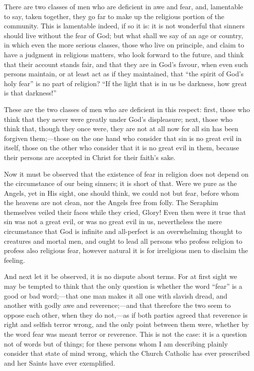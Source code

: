 There are two classes of men who are deficient in awe and fear,
and, lamentable to say, taken together, they go far to make up the
religious portion of the community. This is lamentable indeed, if so
it is: it is not wonderful that sinners should live without the fear
of God; but what shall we say of an age or country, in which even the
more serious classes, those who live on principle, and claim to have a
judgment in religious matters, who look forward to the future, and
think that their account stands fair, and that they are in God's
favour, when even such persons maintain, or at least act as if they
maintained, that ``the spirit of God's holy fear'' is no part
of religion? ``If the light that is in us be darkness, how great
is that darkness!''

These are the two classes of men who are deficient in this respect:
first, those who think that they never were greatly under God's
displeasure; next, those who think that, though they once were, they
are not at all now for all sin has been forgiven them;—those on the
one hand who consider that sin is no great evil in itself, those on
the other who consider that it is no great evil in them, because their
persons are accepted in Christ for their faith's sake.

Now it must be observed that the existence of fear in religion does
not depend on the circumstance of our being sinners; it is short of
that. Were we pure as the Angels, yet in His sight, one should think,
we could not but fear, before whom the heavens are not clean, nor the
Angels free from folly. The Seraphim themselves veiled their faces
while they cried, Glory! Even then were it true that sin was not a
great evil, or was no great evil in us, nevertheless the mere
circumstance that God is infinite and all-perfect is an overwhelming
thought to creatures and mortal men, and ought to lead all persons who
profess religion to profess also religious fear, however natural it is
for irreligious men to disclaim the feeling.

And next let it be observed, it is no dispute about terms. For at
first sight we may be tempted to think that the only question is
whether the word ``fear'' is a good or bad word;—that one
man makes it all one with slavish dread, and another with godly awe
and reverence;—and that therefore the two seem to oppose each other,
when they do not,—as if both parties agreed that reverence is right
and selfish terror wrong, and the only point between them were,
whether by the word fear was meant terror or reverence. This is not
the case: it is a question not of words but of things; for these
persons whom I am describing plainly consider that state of mind
wrong, which the Church Catholic has ever prescribed and her Saints
have ever exemplified.

